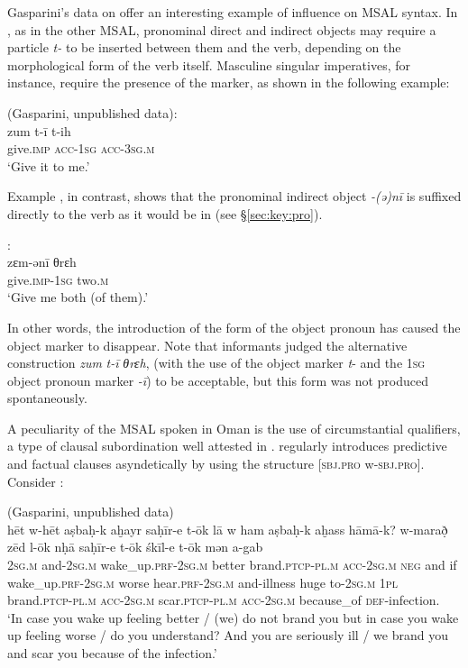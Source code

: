 \documentclass[output=paper]{langsci/langscibook}
\begin{document}
Gasparini’s data on  offer an interesting example of  influence on MSAL syntax. In , as in the other MSAL, pronominal direct and indirect objects may require a particle \textit{t-} to be inserted between them and the verb, depending on the morphological form of the verb itself. Masculine singular imperatives, for instance, require the presence of the marker, as shown in the following example:

\ea	
{ (Gasparini, unpublished data):}\\
\gll zum t-ī t-ih\\
     give.\textsc{imp} \textsc{acc-1sg} \textsc{acc-3sg.m} \\
\glt `Give it to me.'
\z

Example , in contrast, shows that the pronominal indirect object \textit{-(ə)nī} is suffixed directly to the verb as it would be in  (see §\ref{sec:key:pro}).

\ea\label{ex:key:ani}
{ \citep[66]{Gasparini2018}:}\\
\gll zɛm-ənī θrɛh\\
     give.\textsc{imp}-\textsc{1sg} two\textsc{.m}\\
\glt `Give me both (of them).'
\z

 In other words, the introduction of the  form of the object pronoun has caused the  object marker to disappear. Note that informants judged the alternative construction \textit{zum} \textit{t-ī} \textit{θrɛh}, (with the use of the object marker \textit{t}- and the 1\textsc{sg} object pronoun marker \textit{-ī}) to be acceptable, but this form was not produced spontaneously.

A peculiarity of the MSAL spoken in Oman is the use of circumstantial qualifiers, a type of clausal subordination well attested in   \citep{Persson2009}.  regularly introduces predictive and factual  clauses asyndetically by using the structure [\textsc{sbj.pro} w-\textsc{sbj.pro}]. Consider :

\ea\label{ex:key:het}
{ (Gasparini, unpublished data)}\\
\gll hēt w-hēt aṣbaḥ-k aḫayr saḥīr-e t-ōk lā w ham aṣbaḥ-k aḫass hāmā-k? w-marað̣ zēd l-ōk nḥā saḥīr-e t-ōk śkīl-e t-ōk mən a-gab\\
     \textsc{2sg.m} and-\textsc{2sg.m} wake\_up\textsc{.prf}-\textsc{2sg.m} better brand.\textsc{ptcp-pl.m} \textsc{acc-2sg.m} \textsc{neg} and if wake\_up.\textsc{prf-2sg.m} worse hear.\textsc{prf-2sg.m} and-illness huge to-\textsc{2sg.m} \textsc{1pl} brand.\textsc{ptcp-pl.m} \textsc{acc-2sg.m} scar.\textsc{ptcp-pl.m} \textsc{acc-2sg.m} because\_of \textsc{def}-infection.\\
\glt `In case you wake up feeling better / (we) do not brand you but in case you wake up feeling worse / do you understand? And you are seriously ill / we brand you and scar you because of the infection.'
\z
\end{document}
